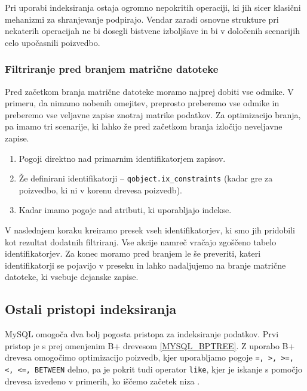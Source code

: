 \documentclass[a4paper,12pt,openright]{book}
\begin{document}
        \noindent
        Pri uporabi indeksiranja ostaja ogromno nepokritih operaciji, ki jih sicer klasični mehanizmi za shranjevanje podpirajo. Vendar zaradi osnovne strukture pri nekaterih operacijah ne bi dosegli bistvene izboljšave in bi v določenih scenarijih celo upočasnili poizvedbo.

        \subsubsection{Filtriranje pred branjem matrične datoteke}

        Pred začetkom branja matrične datoteke moramo najprej dobiti vse odmike. V primeru, da nimamo nobenih omejitev, preprosto preberemo vse odmike in preberemo vse veljavne zapise znotraj matrike podatkov. Za optimizacijo branja, pa imamo tri scenarije, ki lahko že pred začetkom branja izločijo neveljavne zapise.

        \newpage
        \begin{enumerate}
            \item Pogoji direktno nad primarnim identifikatorjem zapisov.
            \item Že definirani identifikatorji – {\tt qobject.ix\_constraints} (kadar gre za poizvedbo, ki ni v korenu drevesa poizvedb).
            \item Kadar imamo pogoje nad atributi, ki uporabljajo indekse.
        \end{enumerate}

        \noindent
        V naslednjem koraku kreiramo presek vseh identifikatorjev, ki smo jih pridobili kot rezultat dodatnih filtriranj. Vse akcije namreč vračajo zgoščeno tabelo identifikatorjev. Za konec moramo pred branjem le še preveriti, kateri identifikatorji se pojavijo v preseku in lahko nadaljujemo na branje matrične datoteke, ki vsebuje dejanske zapise.

        \subsection{Ostali pristopi indeksiranja}

        MySQL omogoča dva bolj pogosta pristopa za indeksiranje podatkov. Prvi pristop je s prej omenjenim B+ drevesom \ref{MYSQL_BPTREE}. Z uporabo B+ drevesa omogočimo optimizacijo poizvedb, kjer uporabljamo pogoje {\tt =, >, >=, <, <=, BETWEEN} delno, pa je pokrit tudi operator {\tt like}, kjer je iskanje s pomočjo drevesa izvedeno v primerih, ko iščemo začetek niza \cite{TREE_HASH_MYSQL}.
\end{document}
